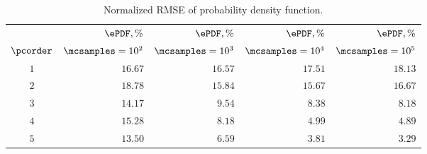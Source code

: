 \begin{table}
  \vspace{-10pt}
  \centering
  \caption{Normalized RMSE of probability density function.}
  \vspace{-10pt}
  \begin{tabular}{crrrr}
    \toprule
    {} & $\ePDF, \%$ & $\ePDF, \%$ & $\ePDF, \%$ & $\ePDF, \%$ \\
    $\pcorder$ & $\mcsamples = 10^2$ & $\mcsamples = 10^3$ & $\mcsamples = 10^4$ & $\mcsamples = 10^5$ \\
    \midrule
    $1$ & $16.67$ & $16.57$ & $17.51$ & $18.13$ \\
    $2$ & $18.78$ & $15.84$ & $15.67$ & $16.67$ \\
    $3$ & $14.17$ & $ 9.54$ & $ 8.38$ & $ 8.18$ \\
    $4$ & $15.28$ & $ 8.18$ & $ 4.99$ & $ 4.89$ \\
    $5$ & $13.50$ & $ 6.59$ & $ 3.81$ & $ 3.29$ \\
    \bottomrule
  \end{tabular}
  \vspace{-10pt}
\end{table}
